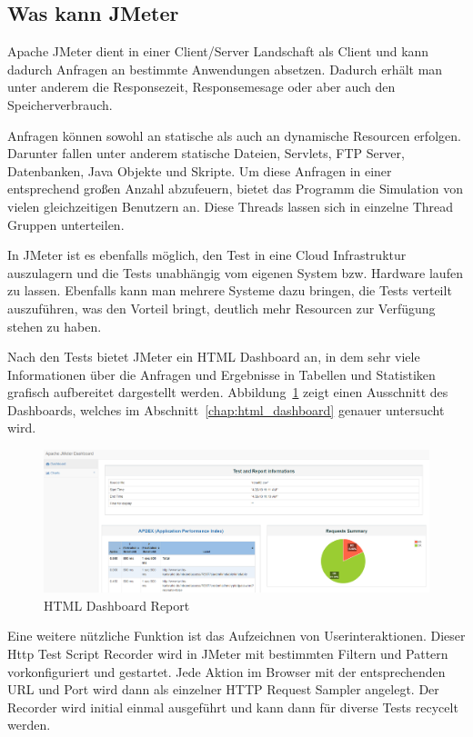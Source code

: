 \documentclass[a4paper,12pt]{article}
\begin{document}
\subsection{Was kann JMeter}
Apache JMeter dient in einer Client/Server Landschaft als Client und kann dadurch Anfragen an bestimmte Anwendungen absetzen. Dadurch erhält man unter anderem die Responsezeit, Responsemesage oder aber auch den Speicherverbrauch.

Anfragen können sowohl an statische als auch an dynamische Resourcen erfolgen. Darunter fallen unter anderem statische Dateien, Servlets, FTP Server, Datenbanken, Java Objekte und Skripte.
Um diese Anfragen in einer entsprechend großen Anzahl abzufeuern, bietet das Programm die Simulation von vielen gleichzeitigen Benutzern an. Diese Threads lassen sich in einzelne Thread Gruppen unterteilen.

In JMeter ist es ebenfalls möglich, den Test in eine Cloud Infrastruktur auszulagern und die Tests unabhängig vom eigenen System bzw. Hardware laufen zu lassen. Ebenfalls kann man mehrere Systeme dazu bringen, die Tests verteilt auszuführen, was den Vorteil bringt, deutlich mehr Resourcen zur Verfügung stehen zu haben. 

Nach den Tests bietet JMeter ein HTML Dashboard an, in dem sehr viele Informationen über die Anfragen und Ergebnisse in Tabellen und Statistiken grafisch aufbereitet dargestellt werden. Abbildung~\ref{fig:dashboard} zeigt einen Ausschnitt des Dashboards, welches im Abschnitt~\ref{chap:html_dashboard} genauer untersucht wird.  

\begin{figure}[htb]%
 \centering
    \includegraphics[width=1\textwidth]{bilder/dashboard.png}
  \caption{HTML Dashboard Report}
  \label{fig:dashboard}
\end{figure}

Eine weitere nützliche Funktion ist das Aufzeichnen von Userinteraktionen. Dieser Http Test Script Recorder wird in JMeter mit bestimmten Filtern und Pattern vorkonfiguriert und gestartet. Jede Aktion im Browser mit der entsprechenden URL und Port wird dann als einzelner HTTP Request Sampler angelegt. Der Recorder wird initial einmal ausgeführt und kann dann für diverse Tests recycelt werden.    
\end{document}
